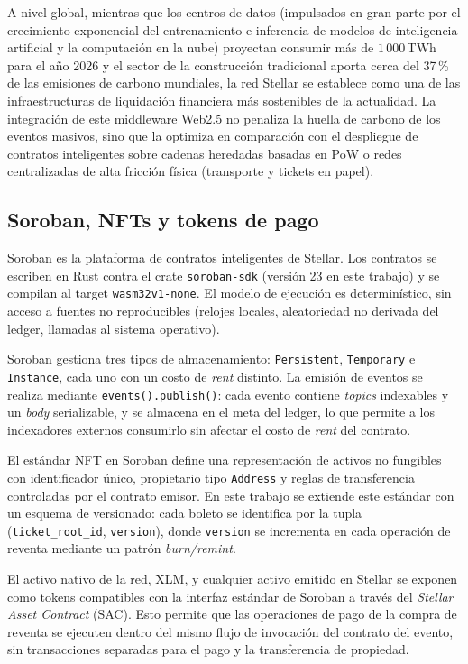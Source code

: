 A nivel global, mientras que los centros de datos (impulsados en gran parte por el crecimiento exponencial
del entrenamiento 
e inferencia de modelos de inteligencia artificial y la computación en la nube) proyectan consumir más de
$1\,000$\,TWh para 
el año 2026 \cite{iea2024electricity} y el sector de la construcción tradicional aporta cerca del 37\,\% de las emisiones de 
carbono mundiales, la red Stellar se establece como una de las infraestructuras de liquidación financiera más
sostenibles de 
la actualidad. La integración de este middleware Web2.5 no penaliza la huella de carbono de los eventos
masivos, sino que la 
optimiza en comparación con el despliegue de contratos inteligentes sobre cadenas heredadas basadas en PoW o
redes centralizadas 
de alta fricción física (transporte y tickets en papel).

\subsection{Soroban, NFTs y tokens de pago}

Soroban es la plataforma de contratos inteligentes de Stellar. Los contratos se escriben en Rust contra el
crate \texttt{soroban-sdk} (versión 23 en este trabajo) y se compilan al target \texttt{wasm32v1-none}. El
modelo de ejecución es determinístico, sin acceso a fuentes no reproducibles (relojes locales, aleatoriedad
no derivada del ledger, llamadas al sistema operativo).

Soroban gestiona tres tipos de almacenamiento: \texttt{Persistent}, \texttt{Temporary} e \texttt{Instance},
cada uno con un costo de \textit{rent} distinto. La emisión de eventos se realiza mediante
\texttt{events().publish()}: cada evento contiene \textit{topics} indexables y un \textit{body} serializable,
y se almacena en el meta del ledger, lo que permite a los indexadores externos consumirlo sin afectar el
costo de \textit{rent} del contrato.

El estándar NFT en Soroban define una representación de activos no fungibles con identificador único,
propietario tipo \texttt{Address} y reglas de transferencia controladas por el contrato emisor. En este
trabajo se extiende este estándar con un esquema de versionado: cada boleto se identifica por la tupla
(\texttt{ticket\_root\_id}, \texttt{version}), donde \texttt{version} se incrementa en cada operación de
reventa mediante un patrón \textit{burn/remint}.

El activo nativo de la red, XLM, y cualquier activo emitido en Stellar se exponen como tokens compatibles con
la interfaz estándar de Soroban a través del \textit{Stellar Asset Contract} (SAC). Esto permite que las
operaciones de pago de la compra de reventa se ejecuten dentro del mismo flujo de invocación del contrato del
evento, sin transacciones separadas para el pago y la transferencia de propiedad.


